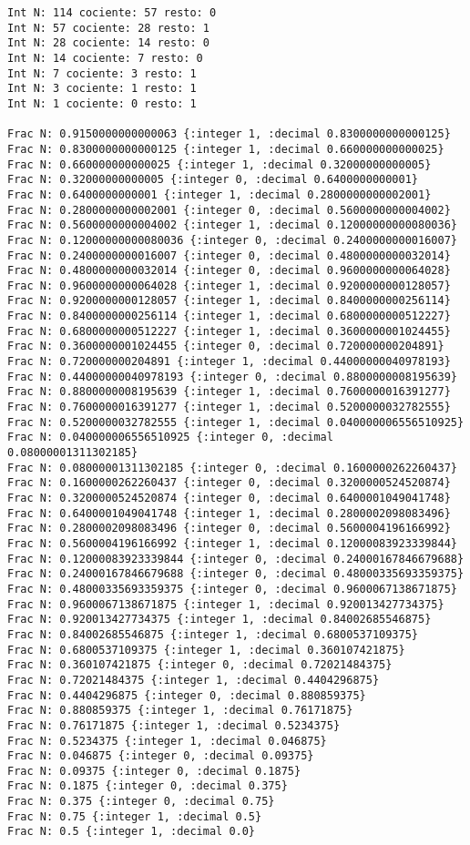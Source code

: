 \documentclass[stu, 12pt, letterpaper, donotrepeattitle, floatsintext, natbib]{apa7}
\begin{document}
\begin{verbatim}
Int N: 114 cociente: 57 resto: 0
Int N: 57 cociente: 28 resto: 1
Int N: 28 cociente: 14 resto: 0
Int N: 14 cociente: 7 resto: 0
Int N: 7 cociente: 3 resto: 1
Int N: 3 cociente: 1 resto: 1
Int N: 1 cociente: 0 resto: 1

Frac N: 0.9150000000000063 {:integer 1, :decimal 0.8300000000000125}
Frac N: 0.8300000000000125 {:integer 1, :decimal 0.660000000000025}
Frac N: 0.660000000000025 {:integer 1, :decimal 0.32000000000005}
Frac N: 0.32000000000005 {:integer 0, :decimal 0.6400000000001}
Frac N: 0.6400000000001 {:integer 1, :decimal 0.2800000000002001}
Frac N: 0.2800000000002001 {:integer 0, :decimal 0.5600000000004002}
Frac N: 0.5600000000004002 {:integer 1, :decimal 0.12000000000080036}
Frac N: 0.12000000000080036 {:integer 0, :decimal 0.2400000000016007}
Frac N: 0.2400000000016007 {:integer 0, :decimal 0.4800000000032014}
Frac N: 0.4800000000032014 {:integer 0, :decimal 0.9600000000064028}
Frac N: 0.9600000000064028 {:integer 1, :decimal 0.9200000000128057}
Frac N: 0.9200000000128057 {:integer 1, :decimal 0.8400000000256114}
Frac N: 0.8400000000256114 {:integer 1, :decimal 0.6800000000512227}
Frac N: 0.6800000000512227 {:integer 1, :decimal 0.3600000001024455}
Frac N: 0.3600000001024455 {:integer 0, :decimal 0.720000000204891}
Frac N: 0.720000000204891 {:integer 1, :decimal 0.44000000040978193}
Frac N: 0.44000000040978193 {:integer 0, :decimal 0.8800000008195639}
Frac N: 0.8800000008195639 {:integer 1, :decimal 0.7600000016391277}
Frac N: 0.7600000016391277 {:integer 1, :decimal 0.5200000032782555}
Frac N: 0.5200000032782555 {:integer 1, :decimal 0.040000006556510925}
Frac N: 0.040000006556510925 {:integer 0, :decimal 0.08000001311302185}
Frac N: 0.08000001311302185 {:integer 0, :decimal 0.1600000262260437}
Frac N: 0.1600000262260437 {:integer 0, :decimal 0.3200000524520874}
Frac N: 0.3200000524520874 {:integer 0, :decimal 0.6400001049041748}
Frac N: 0.6400001049041748 {:integer 1, :decimal 0.2800002098083496}
Frac N: 0.2800002098083496 {:integer 0, :decimal 0.5600004196166992}
Frac N: 0.5600004196166992 {:integer 1, :decimal 0.12000083923339844}
Frac N: 0.12000083923339844 {:integer 0, :decimal 0.24000167846679688}
Frac N: 0.24000167846679688 {:integer 0, :decimal 0.48000335693359375}
Frac N: 0.48000335693359375 {:integer 0, :decimal 0.9600067138671875}
Frac N: 0.9600067138671875 {:integer 1, :decimal 0.920013427734375}
Frac N: 0.920013427734375 {:integer 1, :decimal 0.84002685546875}
Frac N: 0.84002685546875 {:integer 1, :decimal 0.6800537109375}
Frac N: 0.6800537109375 {:integer 1, :decimal 0.360107421875}
Frac N: 0.360107421875 {:integer 0, :decimal 0.72021484375}
Frac N: 0.72021484375 {:integer 1, :decimal 0.4404296875}
Frac N: 0.4404296875 {:integer 0, :decimal 0.880859375}
Frac N: 0.880859375 {:integer 1, :decimal 0.76171875}
Frac N: 0.76171875 {:integer 1, :decimal 0.5234375}
Frac N: 0.5234375 {:integer 1, :decimal 0.046875}
Frac N: 0.046875 {:integer 0, :decimal 0.09375}
Frac N: 0.09375 {:integer 0, :decimal 0.1875}
Frac N: 0.1875 {:integer 0, :decimal 0.375}
Frac N: 0.375 {:integer 0, :decimal 0.75}
Frac N: 0.75 {:integer 1, :decimal 0.5}
Frac N: 0.5 {:integer 1, :decimal 0.0}


\end{verbatim}
\end{document}
